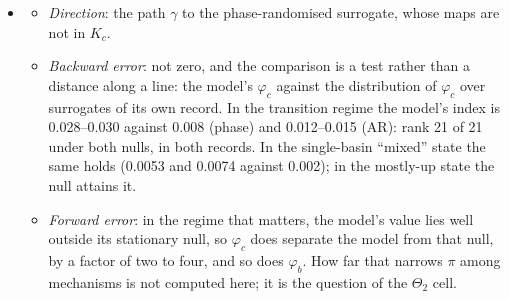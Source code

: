 \documentclass[11pt]{article}
\begin{document}
\begin{itemize}
\begin{itemize}
  \item \emph{Forward error}: undetermined until that number is in hand. The index separates the model from linear stationary nulls, so whether a rival mechanism on the same connectome attains the paper's value is what decides whether it identifies the regime. One does: the two-state reduction, from one start, attains it exactly. So $\varphi_c$ does not identify the regime against that rival, and the statistic that does is the histogram. Rivals of the published kinds, near-Hopf and metastable, have not been run on this connectome.
  \end{itemize}
\item[$\Theta_3$]
  \begin{itemize}
  \item \emph{Direction}: the path $\gamma$ to the phase-randomised surrogate, whose maps are not in $K_c$.
  \item \emph{Backward error}: not zero, and the comparison is a test rather than a distance along a line: the model's $\varphi_c$ against the distribution of $\varphi_c$ over surrogates of its own record. In the transition regime the model's index is 0.028--0.030 against 0.008 (phase) and 0.012--0.015 (AR): rank 21 of 21 under both nulls, in both records. In the single-basin ``mixed'' state the same holds (0.0053 and 0.0074 against 0.002); in the mostly-up state the null attains it.
  \item \emph{Forward error}: in the regime that matters, the model's value lies well outside its stationary null, so $\varphi_c$ does separate the model from that null, by a factor of two to four, and so does $\varphi_b$. How far that narrows $\pi$ among mechanisms is not computed here; it is the question of the $\Theta_2$ cell.
  \end{itemize}
\end{itemize}
\end{document}
